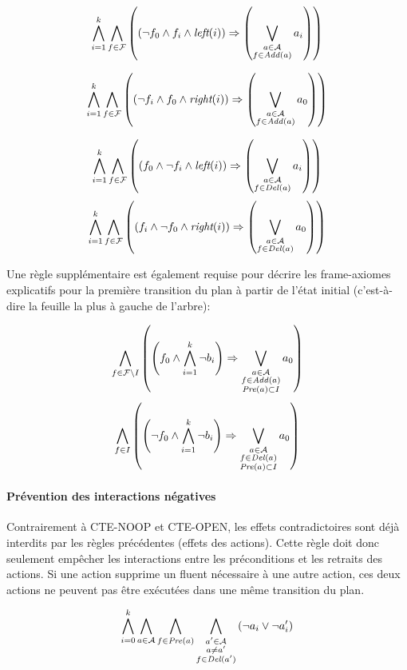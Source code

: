 \begin{small}
\[ \bigwedge\limits_{\substack{i=1}}^{k} \bigwedge\limits_{\substack{f\in \mathcal{F}}}
\left(\left(\neg f_{0} \wedge f_{i} \wedge \textit{left}(i) \right) \Rightarrow \left(\bigvee\limits_{\substack{a \in \mathcal{A} \\ f \in \mathit{Add}(a)}} a_{i}\right)\right)\]

\[ \bigwedge\limits_{\substack{i=1}}^{k} \bigwedge\limits_{\substack{f\in \mathcal{F}}}
\left(\left(\neg f_{i} \wedge f_{0} \wedge \textit{right}(i) \right) \Rightarrow \left(\bigvee\limits_{\substack{a \in \mathcal{A} \\ f \in \mathit{Add}(a)}} a_{0}\right)\right)\]
\end{small}

\begin{small}
\[ \bigwedge\limits_{\substack{i=1}}^{k} \bigwedge\limits_{\substack{f\in \mathcal{F}}}
\left(\left(f_{0} \wedge \neg f_{i} \wedge \textit{left}(i) \right) \Rightarrow \left(\bigvee\limits_{\substack{a \in \mathcal{A} \\ f \in \mathit{Del}(a)}} a_{i}\right)\right)\]
\[ \bigwedge\limits_{\substack{i=1}}^{k} \bigwedge\limits_{\substack{f\in \mathcal{F}}}
\left(\left(f_{i} \wedge \neg f_{0} \wedge \textit{right}(i) \right) \Rightarrow \left(\bigvee\limits_{\substack{a \in \mathcal{A} \\ f \in \mathit{Del}(a)}} a_{0}\right)\right)\]
\end{small}

Une règle supplémentaire est également requise pour décrire les frame-axiomes explicatifs pour la première transition du plan à partir de l'état initial (c'est-à-dire la feuille la plus à gauche de l'arbre):

\[ \bigwedge\limits_{\substack{f\in \mathcal{F}\setminus I}} \left(\left(f_{0}\wedge \bigwedge\limits_{\substack{i=1}}^{k}\neg b_{i}\right) \Rightarrow \bigvee\limits_{\substack{a\in \mathcal{A}\\ f\in\mathit{Add}(a)\\\mathit{Pre}(a) \subset I}} {a}_{0} \right) \]
\[ \bigwedge\limits_{\substack{f\in I}} \left(\left(\neg f_{0}\wedge \bigwedge\limits_{\substack{i=1}}^{k}\neg b_{i}\right) \Rightarrow \bigvee\limits_{\substack{a\in \mathcal{A}\\ f\in\mathit{Del}(a)\\\mathit{Pre}(a) \subset I}} {a}_{0} \right) \]

\paragraph*{Prévention des interactions négatives}

Contrairement à CTE-NOOP et CTE-OPEN, les effets contradictoires sont déjà interdits par les règles précédentes (effets des actions).
Cette règle doit donc seulement empêcher les interactions entre les préconditions et les retraits des actions. Si une action supprime un fluent nécessaire à une autre action, ces deux actions ne peuvent pas être exécutées dans une même transition du plan.

\[ \bigwedge\limits_{\substack{i=0}}^{k} \bigwedge\limits_{\substack{a \in \mathcal{A}}} \bigwedge\limits_{\substack{f\in \mathit{Pre}(a)}} \bigwedge\limits_{\substack{a' \in \mathcal{A} \\ a \neq a' \\ f \in \mathit{Del}(a')}}\left(\neg a_{i} \vee \neg a'_{i}\right) \]
